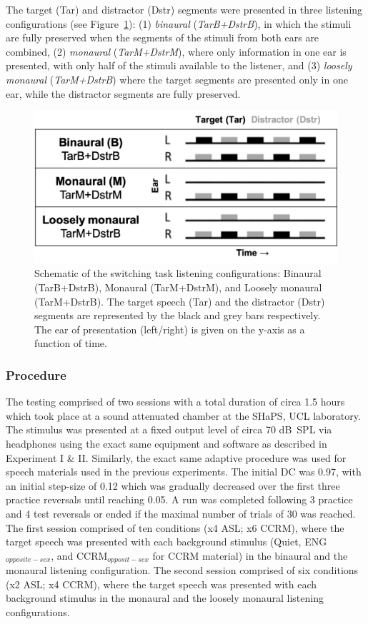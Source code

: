 \documentclass[a4paper, twoside]{templates/ociamthesis}
\begin{document}
The target (Tar) and distractor (Dstr) segments were presented in three listening configurations (see Figure~\ref{fig:LisConfig}): (1) \emph{binaural} (\emph{TarB+DstrB}), in which the stimuli are fully preserved when the segments of the stimuli from both ears are combined, (2) \emph{monaural} (\emph{TarM+DstrM}), where only information in one ear is presented, with only half of the stimuli available to the listener, and (3) \emph{loosely monaural} (\emph{TarM+DstrB}) where the target segments are presented only in one ear, while the distractor segments are fully preserved.

\begin{figure}[ht]
\center
\includegraphics[width=\textwidth]{figures/Chapt1/ListeningConfigurations.PNG}
\caption{\label{fig:LisConfig}{Schematic of the switching task listening configurations: Binaural (TarB+DstrB), Monaural (TarM+DstrM), and Loosely monaural (TarM+DstrB). The target speech (Tar) and the distractor (Dstr) segments are represented by the black and grey bars respectively. The ear of presentation (left/right) is given on the y-axis as a function of time.}}
\end{figure}

\hypertarget{procedure-2}{%
\subsubsection{Procedure}\label{procedure-2}}

\hfill\break
The testing comprised of two sessions with a total duration of circa 1.5 hours which took place at a sound attenuated chamber at the SHaPS, UCL laboratory. The stimulus was presented at a fixed output level of circa 70 dB~SPL via headphones using the exact same equipment and software as described in Experiment I \& II. Similarly, the exact same adaptive procedure was used for speech materials used in the previous experiments. The initial DC was 0.97, with an initial step-size of 0.12 which was gradually decreased over the first three practice reversals until reaching 0.05. A run was completed following 3 practice and 4 test reversals or ended if the maximal number of trials of 30 was reached. The first session comprised of ten conditions (x4 ASL; x6 CCRM), where the target speech was presented with each background stimulus (Quiet, ENG\(_{opposite-sex}\), and CCRM\(_{opposit-sex}\) for CCRM material) in the binaural and the monaural listening configuration. The second session comprised of six conditions (x2 ASL; x4 CCRM), where the target speech was presented with each background stimulus in the monaural and the loosely monaural listening configurations.
\end{document}

